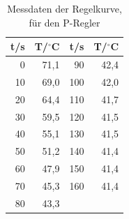 \documentclass[12pt,a4paper]{article}
\begin{document}
\begin{table}[htbp]
\centering
\begin{tabular}{r|rr|r}

t/s & T/$^\circ$C & t/s & T/$^\circ$C \\ \hline
0 & 71,1 & 90 & 42,4 \\ 
10 & 69,0 & 100 & 42,0 \\ 
20 & 64,4 & 110 & 41,7 \\ 
30 & 59,5 & 120 & 41,5 \\ 
40 & 55,1 & 130 & 41,5 \\ 
50 & 51,2 & 140 & 41,4 \\ 
60 & 47,9 & 150 & 41,4 \\ 
70 & 45,3 & 160 & 41,4 \\ 
80 & 43,3 & \multicolumn{1}{l}{} & \multicolumn{1}{l}{} \\ 
\end{tabular}
\caption{Messdaten der Regelkurve, für den P-Regler}
\label{tab:3_3}
\end{table}
\end{document}
